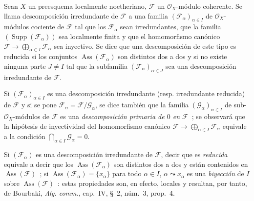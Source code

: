 \begin{definition}[3.2.5]
\label{IV.2.3.2.5-fr}
Sean $X$ un preesquema localmente noetheriano, $\mathcal F$ un
$\mathcal O_X$-módulo coherente. Se llama descomposición irredundante de
$\mathcal F$ a una familia $(\mathcal F_\alpha)_{\alpha\in I}$ de
$\mathcal O_X$-módulos cociente de $\mathcal F$ tal que los
$\mathcal F_\alpha$ sean irredundantes, que la familia
$(\operatorname{Supp}(\mathcal F_\alpha))$ sea localmente finita y que el
homomorfismo canónico
$\mathcal F\to\bigoplus_{\alpha\in I}\mathcal F_\alpha$ sea inyectivo. Se dice
que una descomposición de este tipo es reducida si los conjuntos
$\operatorname{Ass}(\mathcal F_\alpha)$ son distintos dos a dos y si no existe
ninguna parte $J\ne I$ tal que la subfamilia
$(\mathcal F_\alpha)_{\alpha\in J}$ sea una descomposición irredundante de
$\mathcal F$.
\end{definition}

Si $(\mathcal F_\alpha)_{\alpha\in I}$ es una descomposición irredundante
(resp. irredundante reducida) de $\mathcal F$ y si se pone
$\mathcal F_\alpha=\mathcal F/\mathcal G_\alpha$, se dice también que la
familia $(\mathcal G_\alpha)_{\alpha\in I}$ de sub-$\mathcal O_X$-módulos de
$\mathcal F$ es una \emph{descomposición primaria de $0$ en $\mathcal F$}~;
se observará que la hipótesis de inyectividad del homomorfismo canónico
$\mathcal F\to\bigoplus_{\alpha\in I}\mathcal F_\alpha$ equivale a la
condición $\bigcap_{\alpha\in I}\mathcal G_\alpha=0$.

Si $(\mathcal F_\alpha)$ es una descomposición irredundante de $\mathcal F$,
decir que es \emph{reducida} equivale a decir que los
$\operatorname{Ass}(\mathcal F_\alpha)$ son distintos dos a dos y están
contenidos en $\operatorname{Ass}(\mathcal F)$~; si
$\operatorname{Ass}(\mathcal F_\alpha)=\{x_\alpha\}$ para todo $\alpha\in I$,
$\alpha\leadsto x_\alpha$ es una \emph{biyección} de $I$ sobre
$\operatorname{Ass}(\mathcal F)$~: estas propiedades son, en efecto, locales y
resultan, por tanto, de Bourbaki, \emph{Alg. comm.}, cap.~IV, \S~2,
núm.~3, prop.~4.
